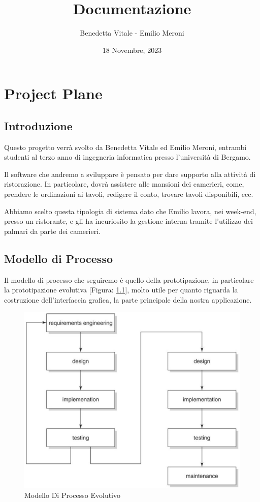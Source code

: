 \documentclass{book}
\title{Documentazione}
\author{Benedetta Vitale - Emilio Meroni}
\date{18 Novembre, 2023}
\begin{document}
\maketitle

\tableofcontents    

\chapter{Project Plane}

\section{Introduzione}

Questo progetto verrà svolto da Benedetta Vitale ed Emilio Meroni, 
entrambi studenti al terzo anno di ingegneria informatica presso 
l'università di Bergamo.

Il software che andremo a sviluppare è pensato per dare supporto 
alla attività di ristorazione. In particolare, dovrà assistere alle mansioni dei camerieri, come, prendere le ordinazioni ai tavoli, redigere il conto, trovare tavoli disponibili, ecc.

Abbiamo scelto questa tipologia di sistema dato che Emilio lavora, nei week-end, presso un ristorante, e gli ha incuriosito la gestione interna tramite l'utilizzo dei palmari da parte dei camerieri. 

\section{Modello di Processo}

Il modello di processo che seguiremo è quello della prototipazione, in particolare la prototipazione evolutiva [Figura: \ref{fig: modello_processo_evolutivo}], molto utile per quanto riguarda la costruzione dell'interfaccia grafica, la parte principale della nostra applicazione.

\begin{figure}
    \centering
    \includegraphics[width = 0.7\linewidth]{../../Immagini/Modello_Processo_Evolutivo.jpg}
    \caption{Modello Di Processo Evolutivo}
    \label{fig: modello_processo_evolutivo}
    
\end{figure}
\end{document}
